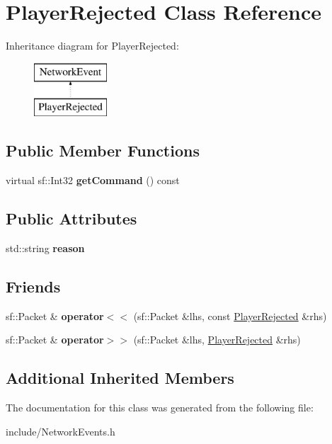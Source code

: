 \hypertarget{class_player_rejected}{\section{Player\-Rejected Class Reference}
\label{class_player_rejected}
}
Inheritance diagram for Player\-Rejected\-:\begin{figure}[H]
\begin{center}
\leavevmode
\includegraphics[height=2.000000cm]{class_player_rejected}
\end{center}
\end{figure}
\subsection*{Public Member Functions}
\begin{DoxyCompactItemize}
\item 
\hypertarget{class_player_rejected_adb1c49e808165dc9ab8b7d1455c49188}{virtual sf\-::\-Int32 {\bfseries get\-Command} () const }\label{class_player_rejected_adb1c49e808165dc9ab8b7d1455c49188}

\end{DoxyCompactItemize}
\subsection*{Public Attributes}
\begin{DoxyCompactItemize}
\item 
\hypertarget{class_player_rejected_aa46e86d31cad142d485d63dce947e9a6}{std\-::string {\bfseries reason}}\label{class_player_rejected_aa46e86d31cad142d485d63dce947e9a6}

\end{DoxyCompactItemize}
\subsection*{Friends}
\begin{DoxyCompactItemize}
\item 
\hypertarget{class_player_rejected_a4e7fa10d7a0c4ef94a5dcee8845c6cf8}{sf\-::\-Packet \& {\bfseries operator$<$$<$} (sf\-::\-Packet \&lhs, const \hyperlink{class_player_rejected}{Player\-Rejected} \&rhs)}\label{class_player_rejected_a4e7fa10d7a0c4ef94a5dcee8845c6cf8}

\item 
\hypertarget{class_player_rejected_afb28a903ec29fe9a7ba7bdeea8345140}{sf\-::\-Packet \& {\bfseries operator$>$$>$} (sf\-::\-Packet \&lhs, \hyperlink{class_player_rejected}{Player\-Rejected} \&rhs)}\label{class_player_rejected_afb28a903ec29fe9a7ba7bdeea8345140}

\end{DoxyCompactItemize}
\subsection*{Additional Inherited Members}


The documentation for this class was generated from the following file\-:\begin{DoxyCompactItemize}
\item 
include/Network\-Events.\-h\end{DoxyCompactItemize}
